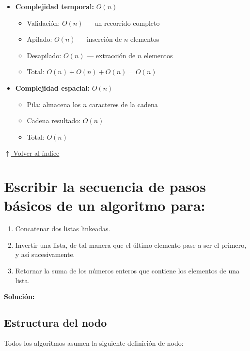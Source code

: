 \documentclass[12pt]{article}
\newcommand{\solucion}{%
    \vspace{0.8em}%
    \textbf{Solución:}%
}
\newcommand{\volverindice}{%
    \vspace{1em}%
    \begin{flushright}%
        \hyperlink{indice}{\small $\uparrow$ Volver al índice}%
    \end{flushright}%
}
\begin{document}
\begin{itemize}
    \item \textbf{Complejidad temporal:} $O(n)$
    \begin{itemize}
        \item Validación: $O(n)$ --- un recorrido completo
        \item Apilado: $O(n)$ --- inserción de $n$ elementos
        \item Desapilado: $O(n)$ --- extracción de $n$ elementos
        \item Total: $O(n) + O(n) + O(n) = O(n)$
    \end{itemize}
    
    \item \textbf{Complejidad espacial:} $O(n)$
    \begin{itemize}
        \item Pila: almacena los $n$ caracteres de la cadena
        \item Cadena resultado: $O(n)$
        \item Total: $O(n)$
    \end{itemize}
\end{itemize}

\volverindice
\newpage

\section[Algoritmos sobre listas linkeadas]{Escribir la secuencia de pasos básicos de un algoritmo para:}

\begin{enumerate}[label=\alph*.]
    \item Concatenar dos listas linkeadas.
    \item Invertir una lista, de tal manera que el último elemento pase a ser el primero, y así sucesivamente.
    \item Retornar la suma de los números enteros que contiene los elementos de una lista.
\end{enumerate}

\solucion

\subsection*{Estructura del nodo}

Todos los algoritmos asumen la siguiente definición de nodo:
\end{document}
